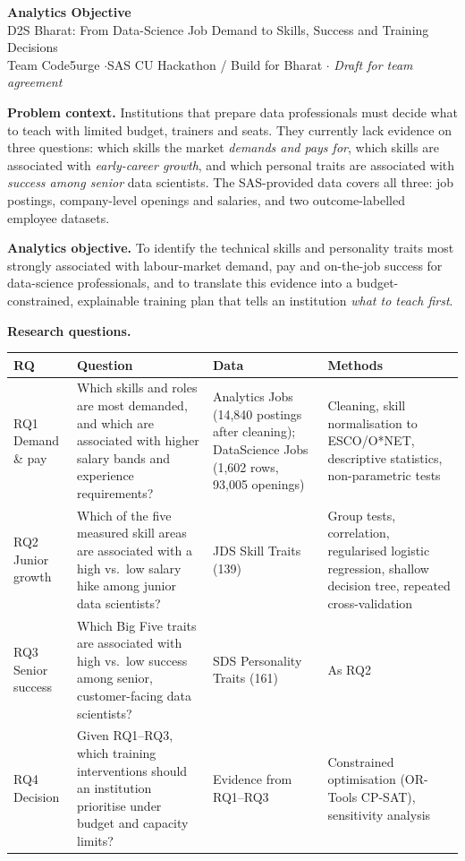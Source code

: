 \documentclass[12pt,a4paper]{article}
\begin{document}
\begin{center}
  {\Large\bfseries Analytics Objective}\\[2pt]
  {\large D2S Bharat: From Data-Science Job Demand to Skills, Success and Training Decisions}\\[4pt]
  {\small Team Code5urge \quad$\cdot$\quad SAS CU Hackathon / Build for Bharat \quad$\cdot$\quad
  \textit{Draft for team agreement}}
\end{center}

\noindent\textbf{Problem context.}
Institutions that prepare data professionals must decide what to teach with limited budget,
trainers and seats. They currently lack evidence on three questions: which skills the market
\emph{demands and pays for}, which skills are associated with \emph{early-career growth}, and which
personal traits are associated with \emph{success among senior} data scientists. The SAS-provided data covers all three:
job postings, company-level openings and salaries, and two outcome-labelled employee datasets.

\vspace{6pt}
\begin{objbox}
\noindent\textbf{Analytics objective.}
To identify the technical skills and personality traits most strongly associated with
labour-market demand, pay and on-the-job success for data-science professionals, and to
translate this evidence into a budget-constrained, explainable training plan that tells an
institution \emph{what to teach first}.
\end{objbox}

\vspace{4pt}
\noindent\textbf{Research questions.}\\[2pt]
{\footnotesize
\begin{tabularx}{\linewidth}{@{}L{1.9cm}Y L{3.4cm} L{3.6cm}@{}}
\toprule
\textbf{RQ} & \textbf{Question} & \textbf{Data} & \textbf{Methods} \\
\midrule
RQ1 Demand \& pay & Which skills and roles are most demanded, and which are associated with
higher salary bands and experience requirements? &
Analytics Jobs (14,840 postings after cleaning); DataScience Jobs (1,602 rows, 93,005 openings) &
Cleaning, skill normalisation to ESCO/O*NET, descriptive statistics, non-parametric tests \\
\addlinespace
RQ2 Junior growth & Which of the five measured skill areas are associated with a high vs.\ low
salary hike among junior data scientists? & JDS Skill Traits (139) &
Group tests, correlation, regularised logistic regression, shallow decision tree,
repeated cross-validation \\
\addlinespace
RQ3 Senior success & Which Big Five traits are associated with high vs.\ low success among
senior, customer-facing data scientists? & SDS Personality Traits (161) & As RQ2 \\
\addlinespace
RQ4 Decision & Given RQ1--RQ3, which training interventions should an institution prioritise
under budget and capacity limits? & Evidence from RQ1--RQ3 &
Constrained optimisation (OR-Tools CP-SAT), sensitivity analysis \\
\bottomrule
\end{tabularx}}
\end{document}

